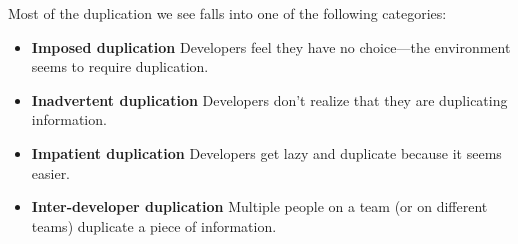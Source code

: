 Most of the duplication we see falls into one of the following categories:

\begin{itemize}
    \item \textbf{Imposed duplication} Developers feel they have no choice—the environment seems to require duplication.
    \item \textbf{Inadvertent duplication}  Developers don't realize that they are duplicating information.
    \item \textbf{Impatient duplication}  Developers get lazy and duplicate because it seems easier.  
    \item \textbf{Inter-developer duplication}  Multiple people on a team (or on different
teams) duplicate a piece of information.
\end{itemize}
